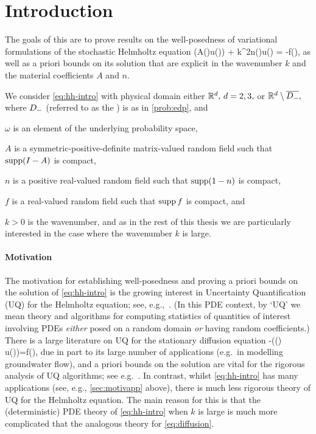 \section{Introduction}\label{sec:intro}
The goals of this  are to prove results on the well-posedness of variational formulations of the stochastic Helmholtz equation
\beq\label{eq:hh-intro}
\grad\cdot\mleft(A(\omega)\grad u(\omega)\mright) + k^2n(\omega)u(\omega) = -f(\omega),
\eeq
as well as a priori bounds on its solution that are explicit in the wavenumber $k$ and the material coefficients $A$ and $n.$


We consider \eqref{eq:hh-intro} with physical domain either $\mathbb R^{d}, \, d=2,3,$ or $\mathbb R^d\setminus\overline{D_{-}},$ where $D_{-}$ (referred to as the ) is as in \cref{prob:edp}, and

\bit
\item $\omega$ is an element of the underlying probability space,
\item $A$ is a symmetric-positive-definite matrix-valued random field such that $\operatorname{supp}(I-A)$ is compact,
\item $n$ is a positive real-valued random field such that $\operatorname{supp}(1-n)$ is compact,
\item $f$ is a real-valued random field such that $\operatorname{supp} f$ is compact, and
  \item $k>0$ is the wavenumber,
  \eit
and as in the rest of this thesis we are particularly interested in the case where the wavenumber $k$ is large.

\paragraph{Motivation} The motivation for establishing well-posedness and proving a priori bounds on the solution of \eqref{eq:hh-intro} is the growing interest in Uncertainty Quantification (UQ) for the Helmholtz equation; see, e.g.,~\cite{XiSh:07,TsXiYi:11,BuGh:14,GaHa:15,FeLiLo:15,FeLiNi:18,LiWaZh:18,HiScScSc:15,BaCaHaZh:18}. (In this PDE context, by `UQ' we mean theory and algorithms for computing statistics of quantities of interest involving PDEs \emph{either} posed on a random domain \emph{or} having random coefficients.) There is a large literature on UQ for the stationary diffusion equation
\beq\label{eq:diffusion}
-\grad\cdot (\kappa(\omega) \grad u(\omega))=f(\omega),
\eeq
due in part to its large number of applications (e.g.~in modelling groundwater flow), and a priori bounds on the solution are vital for the rigorous analysis of UQ algorithms; see e.g.~\cite{BaTeZo:04,BaNoTe:07,Gi:10,MuSt:11,ChScTe:13}. In contrast, whilst \eqref{eq:hh-intro} has many applications (see, e.g., \cref{sec:motivapp} above), there is much less rigorous theory of UQ for the Helmholtz equation. The main reason for this is that the (deterministic) PDE theory of \eqref{eq:hh-intro} when $k$ is large is much more complicated that the analogous theory for \eqref{eq:diffusion}.
 
